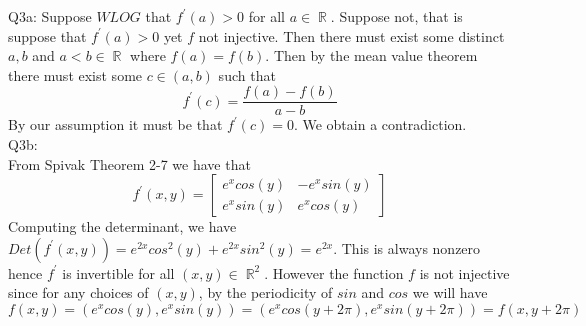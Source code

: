 \documentclass[letterpaper]{article}
\DeclareMathOperator{\R}{\mathbb{R}}
\begin{document}
Q3a: Suppose $WLOG$ that $f^\prime (a) > 0$ for all $a\in \R$. Suppose not, that is suppose that $f^\prime (a) >0$ yet $f$ not injective. Then there must exist some distinct $a,b$ and $a < b\in \R$ where $f(a) = f(b)$. Then by the mean value theorem there must exist some $c\in (a,b)$ such that 
$$f^\prime (c) = \frac{f(a)-f(b)}{a-b}$$ By our assumption it must be that $f^\prime(c) = 0$. We obtain a contradiction. 
\\ Q3b: \\
From Spivak Theorem 2-7 we have that $$f^{\prime}(x,y) = \begin{bmatrix} e^x cos(y) &  -e^x sin(y) \\ e^xsin(y) & e^x cos(y)
\end{bmatrix}$$
Computing the determinant, we have $Det (f^{\prime}(x,y)) = e^{2x} cos^2(y) + e^{2x} sin^2(y) = e^{2x}$. This is always nonzero hence $f^\prime$ is invertible for all $(x,y)\in \R^2$. However the function $f$ is not injective since for any choices of $(x,y)$, by the periodicity of $sin$ and $cos$ we will have $$f(x,y) = (e^x cos(y),e^x sin(y)) = (e^x cos(y+2 \pi), e^x sin(y+2 \pi)) = f(x,y+2 \pi)$$
\end{document}
